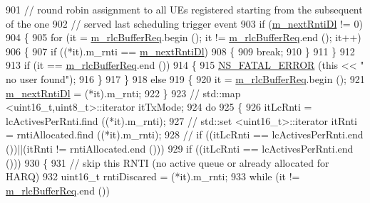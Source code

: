 \begin{DoxyCode}
{901         \textcolor{comment}{// round robin assignment to all UEs registered starting from the subsequent of the one}
902         \textcolor{comment}{// served last scheduling trigger event}
903         \textcolor{keywordflow}{if} (\hyperlink{classns3_1_1MmWaveRrMacScheduler_a0de8f79fecf022efca5e65228d35cca6}{m\_nextRntiDl} != 0)
904         \{
905                 \textcolor{keywordflow}{for} (it = \hyperlink{classns3_1_1MmWaveRrMacScheduler_a4808ca626b0b12682c3f1a079d016997}{m\_rlcBufferReq}.begin (); it != 
      \hyperlink{classns3_1_1MmWaveRrMacScheduler_a4808ca626b0b12682c3f1a079d016997}{m\_rlcBufferReq}.end (); it++)
906                 \{
907                         \textcolor{keywordflow}{if} ((*it).m\_rnti == \hyperlink{classns3_1_1MmWaveRrMacScheduler_a0de8f79fecf022efca5e65228d35cca6}{m\_nextRntiDl})
908                         \{
909                                 \textcolor{keywordflow}{break};
910                         \}
911                 \}
912 
913                 \textcolor{keywordflow}{if} (it == \hyperlink{classns3_1_1MmWaveRrMacScheduler_a4808ca626b0b12682c3f1a079d016997}{m\_rlcBufferReq}.end ())
914                 \{
915                         \hyperlink{group__fatal_ga5131d5e3f75d7d4cbfd706ac456fdc85}{NS\_FATAL\_ERROR} (\textcolor{keyword}{this} << \textcolor{stringliteral}{" no user found"});
916                 \}
917         \}
918         \textcolor{keywordflow}{else}
919         \{
920                 it = \hyperlink{classns3_1_1MmWaveRrMacScheduler_a4808ca626b0b12682c3f1a079d016997}{m\_rlcBufferReq}.begin ();
921                 \hyperlink{classns3_1_1MmWaveRrMacScheduler_a0de8f79fecf022efca5e65228d35cca6}{m\_nextRntiDl} = (*it).m\_rnti;
922         \}
923         \textcolor{comment}{//                      std::map <uint16\_t,uint8\_t>::iterator itTxMode;}
924         \textcolor{keywordflow}{do}
925         \{
926                 itLcRnti = lcActivesPerRnti.find ((*it).m\_rnti);
927                 \textcolor{comment}{//                              std::set <uint16\_t>::iterator itRnti = rntiAllocated.find
       ((*it).m\_rnti);}
928                 \textcolor{comment}{//                              if ((itLcRnti == lcActivesPerRnti.end ())||(itRnti !=
       rntiAllocated.end ()))}
929                 \textcolor{keywordflow}{if} ((itLcRnti == lcActivesPerRnti.end ()))
930                 \{
931                         \textcolor{comment}{// skip this RNTI (no active queue or already allocated for HARQ)}
932                         uint16\_t rntiDiscared = (*it).m\_rnti;
933                         \textcolor{keywordflow}{while} (it != \hyperlink{classns3_1_1MmWaveRrMacScheduler_a4808ca626b0b12682c3f1a079d016997}{m\_rlcBufferReq}.end ())
}
\end{DoxyCode}
